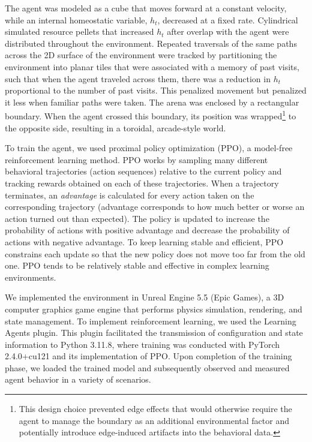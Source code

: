 The agent was modeled as a cube that moves forward at a constant velocity, while an internal homeostatic variable, $h_t$, decreased at a fixed rate. Cylindrical simulated resource pellets that increased $h_t$ after overlap with the agent were distributed throughout the environment. Repeated traversals of the same paths across the 2D surface of the environment were tracked by partitioning the environment into planar tiles that were associated with a memory of past visits, such that when the agent traveled across them, there was a reduction in $h_t$ proportional to the number of past visits. This penalized movement but penalized it less when familiar paths were taken. The arena was enclosed by a rectangular boundary. When the agent crossed this boundary, its position was wrapped\footnote{This design choice prevented edge effects that would otherwise require the agent to manage the boundary as an additional environmental factor and potentially introduce edge-induced artifacts into the behavioral data.} to the opposite side, resulting in a toroidal, arcade-style world.

To train the agent, we used proximal policy optimization (PPO), a model-free reinforcement learning method. PPO works by sampling many different behavioral trajectories (action sequences) relative to the current policy and tracking rewards obtained on each of these trajectories. When a trajectory terminates, an \emph{advantage} is calculated for every action taken on the corresponding trajectory (advantage corresponds to how much better or worse an action turned out than expected). The policy is updated to increase the probability of actions with positive advantage and decrease the probability of actions with negative advantage. To keep learning stable and efficient, PPO constrains each update so that the new policy does not move too far from the old one. PPO tends to be relatively stable and effective in complex learning environments.

We implemented the environment in Unreal Engine 5.5 (Epic Games), a 3D computer graphics game engine that performs physics simulation, rendering, and state management. To implement reinforcement learning, we used the Learning Agents plugin. This plugin facilitated the transmission of configuration and state information to Python 3.11.8, where training was conducted with PyTorch 2.4.0+cu121 and its implementation of PPO. Upon completion of the training phase, we loaded the trained model and subsequently observed and measured agent behavior in a variety of scenarios.

